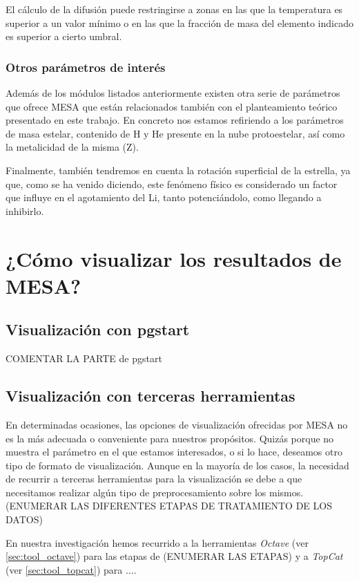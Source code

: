 El cálculo de la difusión puede restringirse a zonas en las que la temperatura es superior a un valor mínimo o en las que la fracción de masa del elemento indicado es superior a cierto umbral.\par

\subsubsection{Otros parámetros de interés}
Además de los módulos listados anteriormente existen otra serie de parámetros que ofrece MESA que están relacionados también con el planteamiento teórico presentado en este trabajo. En concreto nos estamos refiriendo a los parámetros de masa estelar, contenido de H y He presente en la nube protoestelar, así como la metalicidad de la misma (Z).\par

Finalmente, también tendremos en cuenta la rotación superficial de la estrella, ya que, como se ha venido diciendo, este fenómeno físico es considerado un factor que influye en el agotamiento del Li, tanto potenciándolo, como llegando a inhibirlo.\par

\section{¿Cómo visualizar los resultados de MESA?}
\subsection{Visualización con pgstart}
COMENTAR LA PARTE de pgstart
\subsection{Visualización con terceras herramientas}
En determinadas ocasiones, las opciones de visualización ofrecidas por MESA no es la más adecuada o conveniente para nuestros propósitos. Quizás porque no muestra el parámetro en el que estamos interesados, o si lo hace, deseamos otro tipo de formato de visualización. Aunque en la mayoría de los casos, la necesidad de recurrir a terceras herramientas para la visualización se debe a que necesitamos realizar algún tipo de preprocesamiento sobre los mismos. (ENUMERAR LAS DIFERENTES ETAPAS DE TRATAMIENTO DE LOS DATOS)

En nuestra investigación hemos recurrido a la herramientas \textit{Octave} (ver \ref{sec:tool_octave}) para las etapas de (ENUMERAR LAS ETAPAS) y a \textit{TopCat} (ver \ref{sec:tool_topcat}) para .... 



